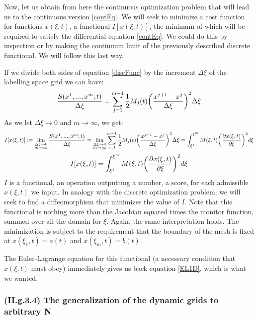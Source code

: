 \documentclass[11pt, a4paper]{article} %
\begin{document}
Now, let us obtain from here the continuous optimization problem that will lead us to the continuous version \eqref{contEq}. We will seek to minimize a cost function for functions $x(\xi,t)$, a functional $I[x(\xi,t)]$, the minimum of which will be required to satisfy the differential equation \eqref{contEq}. We could do this by inspection or by making the continuum limit of the previously described discrete functional. We will follow this last way.

If we divide both sides of equation \eqref{discFunc} by the increment $\Delta \xi$ of the labelling space grid we can have:
\begin{equation}
\frac{S( x^1,...,x^m;t)}{\Delta\xi}=\sum_{j=1}^{m-1} \frac{1}{2} M_j(t) \qty(\frac{x^{j+1}-x^j}{\Delta \xi})^2 \Delta \xi
\end{equation}
As we let $\Delta \xi \rightarrow 0$ and $m\rightarrow \infty$, we get:
\begin{equation}
I[x(\xi,t)]:=\lim\limits_{\substack{\Delta \xi \rightarrow 0\\ m \rightarrow \infty}}\frac{S( x^1,...,x^m;t)}{\Delta\xi}=\lim\limits_{\substack{\Delta \xi \rightarrow 0\\ m \rightarrow \infty}} \sum_{j=1}^{m-1}\frac{1}{2} M_j(t) \qty(\frac{x^{j+1}-x^j}{\Delta \xi})^2 \Delta \xi=\int_{\xi^1}^{\xi^m} M(\xi,t) \qty(\pdv{x(\xi,t)}{\xi})^2d\xi
\end{equation}
\begin{equation}\label{functional1D}
I[x(\xi,t)]=\int_{\xi^1}^{\xi^m} M(\xi,t) \qty(\pdv{x(\xi,t)}{\xi})^2d\xi
\end{equation}
$I$ is a functional, an operation outputting a number, a score, for each admissible $x(\xi,t)$ we input. In analogy with the discrete optimization problem, we will seek to find a diffeomorphism that minimizes the value of $I$. Note that this functional is nothing more than the Jacobian squared times the monitor function, summed over all the domain for $\xi$. Again, the same interpretation holds. The minimization is subject to the requirement that the boundary of the mesh is fixed at $x(\xi_1,t)=a(t)$ and $x(\xi_m,t)=b(t)$.

The Euler-Lagrange equation for this functional (a necessary condition that $x(\xi,t)$ must obey) immediately gives us back equation \eqref{EL1D}, which is what we wanted.

\subsubsection*{\bf (II.g.3.4) The generalization of the dynamic grids to arbitrary N}
\end{document}
